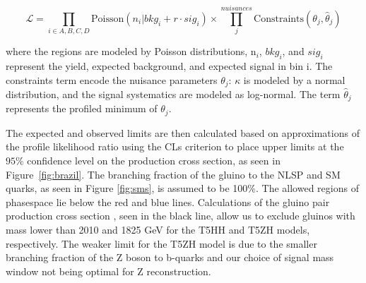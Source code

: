 \begin{equation}
\mathcal{L}=\prod_{i \in A, B, C, D}\mathrm{Poisson}\left(n_i \vert bkg_i + r\cdot sig_i\right) \times \prod^{nuisances}_j \mathrm{Constraints}\left(\theta_j , \hat{\theta}_j\right)
\end{equation}

where the regions are modeled by Poisson distributions, n$_{i}$, $bkg_{i}$, and $sig_{i}$ represent the yield, expected background, and  expected signal in bin i. The constraints term encode the nuisance parameters $\theta_{j}$: $\kappa$ is modeled by a normal distribution, and the signal systematics are modeled as log-normal. The term $\hat{\theta}_{j}$ represents the profiled minimum of $\theta_{j}$. 

The expected and observed limits are then calculated based on approximations of the profile likelihood ratio using the CLs criterion \cite{0954-3899-28-10-313} to place upper limits at the $95\%$ confidence level on the production cross section, as seen in Figure~\ref{fig:brazil}. The branching fraction of the gluino to the NLSP and SM quarks, as seen in Figure \ref{fig:sms}, is assumed to be 100\%. The allowed regions of phasespace lie below the red and blue lines. Calculations of the gluino pair production cross section \cite{ggcs}, seen in the black line, allow us to exclude gluinos with mass lower than 2010 and 1825 GeV for the T5HH and T5ZH models, respectively. The weaker limit for the T5ZH model is due to the smaller branching fraction of the Z boson to b-quarks and our choice of signal mass window not being optimal for Z reconstruction.

